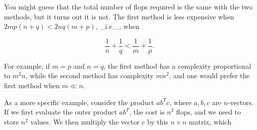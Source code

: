You might guess that the total number of flops required is the same with the two methods, but it turns out it is not. The first method is less expensive when \(2mp(n+q)<2nq(m+p)\), _i.e._, when

\[\frac{1}{n}+\frac{1}{q}<\frac{1}{m}+\frac{1}{p}.\]

For example, if \(m=p\) and \(n=q\), the first method has a complexity proportional to \(m^{2}n\), while the second method has complexity \(mn^{2}\), and one would prefer the first method when \(m\ll n\).

As a more specific example, consider the product \(ab^{T}c\), where \(a,b,c\) are \(n\)-vectors. If we first evaluate the outer product \(ab^{T}\), the cost is \(n^{2}\) flops, and we need to store \(n^{2}\) values. We then multiply the vector \(c\) by this \(n\times n\) matrix, which 